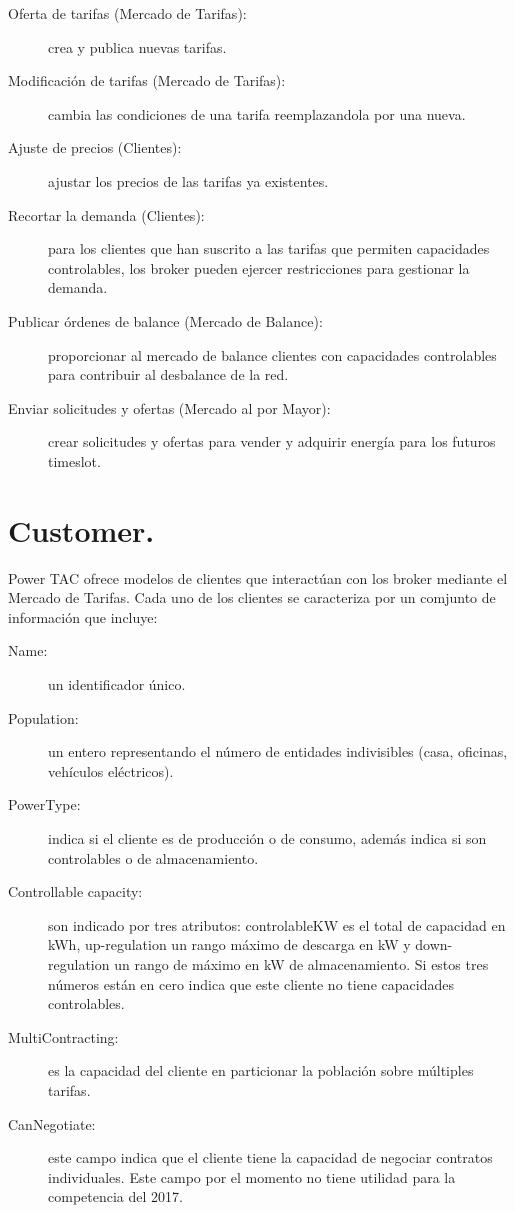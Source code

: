 \begin{description}
	\item [Oferta de tarifas (Mercado de Tarifas):] crea y publica nuevas tarifas.
	\item [Modificación de tarifas (Mercado de Tarifas):]  cambia las condiciones de una tarifa reemplazandola por una nueva.
	\item [Ajuste de precios (Clientes):] ajustar los precios de las tarifas ya existentes.
	\item [Recortar la demanda (Clientes):] para los clientes que han suscrito a las tarifas que permiten capacidades controlables, los broker pueden ejercer restricciones para gestionar la demanda.
	\item [Publicar órdenes de balance (Mercado de Balance):] proporcionar al mercado de balance clientes con capacidades controlables para contribuir al desbalance de la red.
	\item [Enviar solicitudes y ofertas (Mercado al por Mayor):]  crear solicitudes y ofertas para vender y adquirir energía para los futuros timeslot.
\end{description}
\section{Customer.}

Power TAC ofrece modelos de clientes que interactúan con los broker mediante el Mercado de Tarifas. Cada uno de los clientes se caracteriza por un comjunto de información que incluye:

\begin{description}
	\item[Name:] un identificador único.
	\item[Population:] un entero representando el número de entidades indivisibles (casa, oficinas, vehículos eléctricos).
	\item[PowerType:] indica si el cliente es de producción o de consumo, además indica si  son controlables o de almacenamiento.
	\item[Controllable capacity:] son indicado por tres atributos: controlableKW  es el total de capacidad en kWh, up-regulation un rango máximo de descarga en kW y down-regulation un rango de máximo en kW de almacenamiento. Si estos tres números están en cero indica que este cliente no tiene capacidades controlables.
	\item[MultiContracting:] es la capacidad del cliente en particionar la población sobre múltiples tarifas.
	\item[CanNegotiate:] este campo indica que el cliente tiene la capacidad de negociar contratos individuales. Este campo por el momento no tiene utilidad para la competencia del 2017.
\end{description}

